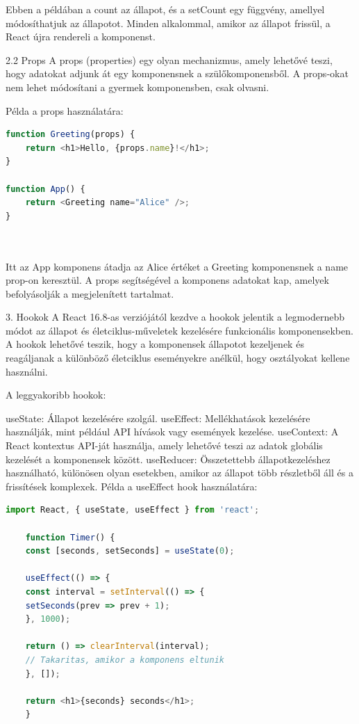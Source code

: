 \documentclass[colorlinks]{thesis-kando}
\theoremstyle{definition}
\theoremstyle{remark}
\begin{document}
Ebben a példában a count az állapot, és a setCount egy függvény, amellyel módosíthatjuk az állapotot. Minden alkalommal, amikor az állapot frissül, a React újra rendereli a komponenst.

2.2 Props
A props (properties) egy olyan mechanizmus, amely lehetővé teszi, hogy adatokat adjunk át egy komponensnek a szülőkomponensből. A props-okat nem lehet módosítani a gyermek komponensben, csak olvasni.

Példa a props használatára:
\begin{lstlisting}[language=JavaScript]
function Greeting(props) {
	return <h1>Hello, {props.name}!</h1>;
}

function App() {
	return <Greeting name="Alice" />;
}

	
\end{lstlisting}


Itt az App komponens átadja az Alice értéket a Greeting komponensnek a name prop-on keresztül. A props segítségével a komponens adatokat kap, amelyek befolyásolják a megjelenített tartalmat.

3. Hookok
A React 16.8-as verziójától kezdve a hookok jelentik a legmodernebb módot az állapot és életciklus-műveletek kezelésére funkcionális komponensekben. A hookok lehetővé teszik, hogy a komponensek állapotot kezeljenek és reagáljanak a különböző életciklus eseményekre anélkül, hogy osztályokat kellene használni.

A leggyakoribb hookok:

useState: Állapot kezelésére szolgál.
useEffect: Mellékhatások kezelésére használják, mint például API hívások vagy események kezelése.
useContext: A React kontextus API-ját használja, amely lehetővé teszi az adatok globális kezelését a komponensek között.
useReducer: Összetettebb állapotkezeléshez használható, különösen olyan esetekben, amikor az állapot több részletből áll és a frissítések komplexek.
Példa a useEffect hook használatára:
\begin{lstlisting}[language=JavaScript]
	import React, { useState, useEffect } from 'react';
	
	function Timer() {
	const [seconds, setSeconds] = useState(0);
		
	useEffect(() => {
	const interval = setInterval(() => {
	setSeconds(prev => prev + 1);
	}, 1000);
			
	return () => clearInterval(interval); 
	// Takaritas, amikor a komponens eltunik
	}, []);
		
	return <h1>{seconds} seconds</h1>;
	}
\end{lstlisting}
\end{document}
